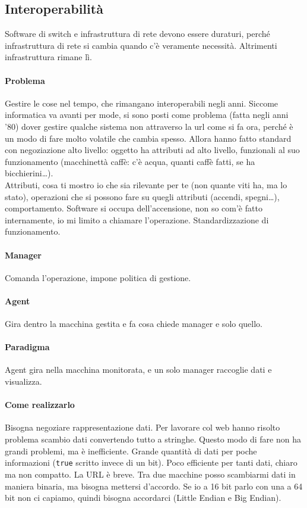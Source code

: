\documentclass[10pt]{book}
\begin{document}
\subsection{Interoperabilità}
Software di switch e infrastruttura di rete devono essere duraturi, perché infrastruttura di rete si cambia quando c'è veramente necessità. Altrimenti infrastruttura rimane lì. 
\paragraph{Problema} Gestire le cose nel tempo, che rimangano interoperabili negli anni. Siccome informatica va avanti per mode, si sono posti come problema (fatta negli anni '80) dover gestire qualche sistema non attraverso la url come si fa ora, perché è un modo di fare molto volatile che cambia spesso. Allora hanno fatto standard con negoziazione alto livello: oggetto ha attributi ad alto livello, funzionali al suo funzionamento (macchinettà caffè: c'è acqua, quanti caffè fatti, se ha bicchierini\ldots).\\
Attributi, cosa ti mostro io che sia rilevante per te (non quante viti ha, ma lo stato), operazioni che si possono fare su quegli attributi (accendi, spegni\ldots), comportamento. Software si occupa dell'accensione, non so com'è fatto internamente, io mi limito a chiamare l'operazione. Standardizzazione di funzionamento.
\paragraph{Manager} Comanda l'operazione, impone politica di gestione.
\paragraph{Agent} Gira dentro la macchina gestita e fa cosa chiede manager e solo quello.
\paragraph{Paradigma} Agent gira nella macchina monitorata, e un solo manager raccoglie dati e visualizza.
\paragraph{Come realizzarlo} Bisogna negoziare rappresentazione dati. Per lavorare col web hanno risolto problema scambio dati convertendo tutto a stringhe. Questo modo di fare non ha grandi problemi, ma è inefficiente. Grande quantità di dati per poche informazioni (\texttt{true} scritto invece di un bit). Poco efficiente per tanti dati, chiaro ma non compatto. La URL è breve. Tra due macchine posso scambiarmi dati in maniera binaria, ma bisogna mettersi d'accordo. Se io a 16 bit parlo con una a 64 bit non ci capiamo, quindi bisogna accordarci (Little Endian e Big Endian).
\end{document}
